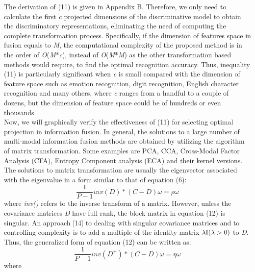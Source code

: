 \documentclass[10pt,journal,compsoc]{IEEEtran}
\begin{document}
The derivation of (11) is given in Appendix B. Therefore, we only need to calculate the first \emph{c} projected dimensions of the discriminative model to obtain the discriminatory representations, eliminating the need of computing the complete transformation process. Specifically, if the dimension of features space in fusion equals to \emph{M}, the computational complexity of the proposed method is in the order of \emph{O}(\emph{M}*\emph{c}), instead of \emph{O}(\emph{M}*\emph{M}) as the other transformation based methods would require, to find the optimal recognition accuracy. Thus, inequality (11) is particularly significant when \emph{c} is small compared with the dimension of feature space such as emotion recognition, digit recognition, English character recognition and many others, where \emph{c} ranges from a handful to a couple of dozens, but the dimension of feature space could be of hundreds or even thousands. \\\indent  Now, we will graphically verify the effectiveness of (11) for selecting optimal projection in information fusion. In general, the solutions to a large number of multi-modal information fusion methods are obtained by utilizing the algorithm of matrix transformation. Some examples are PCA, CCA, Cross-Modal Factor Analysis (CFA), Entropy Component analysis (ECA) and their kernel versions. The solutions to matrix transformation are usually the eigenvector associated with the eigenvalue in a form similar to that of equation (6):
\begin{equation}
\frac{1}{{P - 1}}inv(D)*(C - D)\omega  = \rho \omega
\end{equation}
where \textit{inv()} refers to the inverse transform of a matrix. However, unless the covariance matrices \textit{D} have full rank, the block matrix in equation (12) is singular. An approach [14] to dealing with singular covariance matrices and to controlling complexity is to add a multiple of the identity matrix $\lambda {\rm I}(\lambda  > 0)$ to \textit{D}. Thus, the generalized form of equation (12) can be written as:
\begin{equation}
\frac{1}{{P - 1}}inv({D^ + })*(C - D)\omega  = \eta \omega
\end{equation}
where
\end{document}
